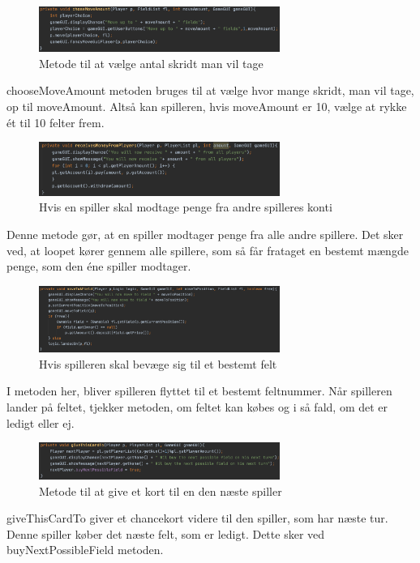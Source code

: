 \begin{figure}[H]
    \centering
    \includegraphics[width=0.7\textwidth]{sources/7_implementering/ControllerMoveAmount.png}
    \caption{Metode til at vælge antal skridt man vil tage}
    \label{fig:MoveAmount}
\end{figure}
chooseMoveAmount metoden bruges til at vælge hvor mange skridt, man vil tage, op til moveAmount. Altså kan spilleren, hvis moveAmount er 10, vælge at rykke ét til 10 felter frem.



\begin{figure}[H]
    \centering
    \includegraphics[width=0.7\textwidth]{sources/7_implementering/ControllerRecieveMoney.png}
    \caption{Hvis en spiller skal modtage penge fra andre spilleres konti}
    \label{fig:recieveMoney}
\end{figure}
Denne metode gør, at en spiller modtager penge fra alle andre spillere. Det sker ved, at loopet kører gennem alle spillere, som så får frataget  en bestemt mængde penge, som den éne spiller modtager.



\begin{figure}[H]
    \centering
    \includegraphics[width=0.7\textwidth]{sources/7_implementering/ControllermoveToField.png}
    \caption{Hvis spilleren skal bevæge sig til et bestemt felt}
    \label{fig:chance}
\end{figure}
I metoden her, bliver spilleren flyttet til et bestemt feltnummer. Når spilleren lander på feltet, tjekker metoden, om feltet kan købes og i så fald, om det er ledigt eller ej.



\begin{figure}[H]
    \centering
    \includegraphics[width=0.7\textwidth]{sources/7_implementering/ControllerGiveCard.png}
    \caption{Metode til at give et kort til en den næste spiller}
    \label{fig:giveCard}
\end{figure}
giveThisCardTo giver et chancekort videre til den spiller, som har næste tur. Denne spiller køber det næste felt, som er ledigt. Dette sker ved buyNextPossibleField metoden.





